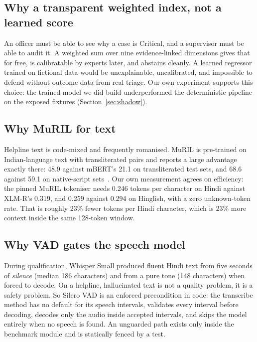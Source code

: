 \documentclass[11pt,a4paper]{article}
\begin{document}
\subsection{Why a transparent weighted index, not a learned score}
\label{sec:whyindex}
An officer must be able to see why a case is Critical, and a supervisor must be able to audit it. A
weighted sum over nine evidence-linked dimensions gives that for free, is calibratable by experts
later, and abstains cleanly. A learned regressor trained on fictional data would be unexplainable,
uncalibrated, and impossible to defend without outcome data from real triage. Our own experiment
supports this choice: the trained model we did build underperformed the deterministic pipeline on the
exposed fixtures (Section~\ref{sec:shadow}).

\subsection{Why MuRIL for text}
\label{sec:whymuril}
Helpline text is code-mixed and frequently romanised. MuRIL is pre-trained on Indian-language text
with transliterated pairs and reports a large advantage exactly there: 48.9 against mBERT's 21.1 on
transliterated test sets, and 68.6 against 59.1 on native-script sets~\cite{khanuja2021}. Our own
measurement agrees on efficiency: the pinned MuRIL tokeniser needs 0.246 tokens per character on
Hindi against XLM-R's 0.319, and 0.259 against 0.294 on Hinglish, with a zero unknown-token rate.
That is roughly 23\% fewer tokens per Hindi character, which is 23\% more context inside the same
128-token window.

\subsection{Why VAD gates the speech model}
\label{sec:whyvad}
During qualification, Whisper Small produced fluent Hindi text from five seconds of \emph{silence}
(median 186 characters) and from a pure tone (148 characters) when forced to decode. On a helpline,
hallucinated text is not a quality problem, it is a safety problem. So Silero VAD is an enforced
precondition in code: the transcribe method has no default for its speech intervals, validates every
interval before decoding, decodes only the audio inside accepted intervals, and skips the model
entirely when no speech is found. An unguarded path exists only inside the benchmark module and is
statically fenced by a test.
\end{document}
